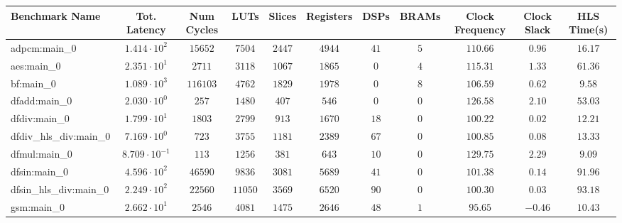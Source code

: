 \begin{tabular}{|l|c|c|c|c|c|c|c|c|c|c|}
\hline
Benchmark Name          & Tot. Latency            & Num Cycles & LUTs      & Slices    & Registers & DSPs    & BRAMs  & Clock Frequency & Clock Slack & HLS Time(s) \\
\hline
adpcm:main\_0           & $ 1.414 \cdot 10^{2}  $ & $ 15652  $ & $ 7504  $ & $ 2447  $ & $ 4944  $ & $ 41  $ & $ 5  $ & $ 110.66      $ & $ 0.96    $ & $ 16.17   $ \\
aes:main\_0             & $ 2.351 \cdot 10^{1}  $ & $ 2711   $ & $ 3118  $ & $ 1067  $ & $ 1865  $ & $ 0   $ & $ 4  $ & $ 115.31      $ & $ 1.33    $ & $ 61.36   $ \\
bf:main\_0              & $ 1.089 \cdot 10^{3}  $ & $ 116103 $ & $ 4762  $ & $ 1829  $ & $ 1978  $ & $ 0   $ & $ 8  $ & $ 106.59      $ & $ 0.62    $ & $ 9.58    $ \\
dfadd:main\_0           & $ 2.030 \cdot 10^{0}  $ & $ 257    $ & $ 1480  $ & $ 407   $ & $ 546   $ & $ 0   $ & $ 0  $ & $ 126.58      $ & $ 2.10    $ & $ 53.03   $ \\
dfdiv:main\_0           & $ 1.799 \cdot 10^{1}  $ & $ 1803   $ & $ 2799  $ & $ 913   $ & $ 1670  $ & $ 18  $ & $ 0  $ & $ 100.22      $ & $ 0.02    $ & $ 12.21   $ \\
dfdiv\_hls\_div:main\_0 & $ 7.169 \cdot 10^{0}  $ & $ 723    $ & $ 3755  $ & $ 1181  $ & $ 2389  $ & $ 67  $ & $ 0  $ & $ 100.85      $ & $ 0.08    $ & $ 13.33   $ \\
dfmul:main\_0           & $ 8.709 \cdot 10^{-1} $ & $ 113    $ & $ 1256  $ & $ 381   $ & $ 643   $ & $ 10  $ & $ 0  $ & $ 129.75      $ & $ 2.29    $ & $ 9.09    $ \\
dfsin:main\_0           & $ 4.596 \cdot 10^{2}  $ & $ 46590  $ & $ 9836  $ & $ 3081  $ & $ 5689  $ & $ 41  $ & $ 0  $ & $ 101.38      $ & $ 0.14    $ & $ 91.96   $ \\
dfsin\_hls\_div:main\_0 & $ 2.249 \cdot 10^{2}  $ & $ 22560  $ & $ 11050 $ & $ 3569  $ & $ 6520  $ & $ 90  $ & $ 0  $ & $ 100.30      $ & $ 0.03    $ & $ 93.18   $ \\
gsm:main\_0             & $ 2.662 \cdot 10^{1}  $ & $ 2546   $ & $ 4081  $ & $ 1475  $ & $ 2646  $ & $ 48  $ & $ 1  $ & $ 95.65       $ & $ -0.46   $ & $ 10.43   $ \\

\end{tabular}
